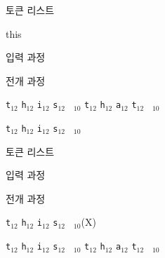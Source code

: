 \documentclass{beamer}
\begin{document}
%
\begin{frame}[fragile]{토큰 리스트}
\begin{verbatim*}
\def\mytoken{\iftrue this \else that \fi}
\mytoken
\end{verbatim*}
    \bigskip
    \alert{입력 과정}
    
    
    \bigskip
    \alert{전개 과정}
    
    \quad
    \verb|t|$_{12}$\quad
    \verb|h|$_{12}$\quad
    \verb|i|$_{12}$\quad
    \verb|s|$_{12}$\quad
    \verb*| |$_{10}$\quad
    \quad
    \verb|t|$_{12}$\quad
    \verb|h|$_{12}$\quad
    \verb|a|$_{12}$\quad
    \verb|t|$_{12}$\quad
    \verb*| |$_{10}$\quad

    \bigskip
    \verb|t|$_{12}$\quad
    \verb|h|$_{12}$\quad
    \verb|i|$_{12}$\quad
    \verb|s|$_{12}$\quad
    \verb*| |$_{10}$\quad
\end{frame}


%
\begin{frame}[fragile]{토큰 리스트}
\begin{verbatim*}
\def\tokentwo{\iftrue this \else that \fi}
\def\tokenone#1{...}
\expandafter\tokenone\tokentwo
\end{verbatim*}
    \bigskip

    \alert{입력 과정}
    
    \quad
    \quad
    
    \bigskip
    \alert{전개 과정}

    \quad
    \verb|t|$_{12}$\quad
    \verb|h|$_{12}$\quad
    \verb|i|$_{12}$\quad
    \verb|s|$_{12}$\quad
    \verb*| |$_{10}$\quad (X)

    \bigskip
    \quad
    \quad
    \verb|t|$_{12}$\quad
    \verb|h|$_{12}$\quad
    \verb|i|$_{12}$\quad
    \verb|s|$_{12}$\quad
    \verb*| |$_{10}$\quad
    \quad
    \verb|t|$_{12}$\quad
    \verb|h|$_{12}$\quad
    \verb|a|$_{12}$\quad
    \verb|t|$_{12}$\quad
    \verb*| |$_{10}$\quad
\end{frame}
\end{document}
